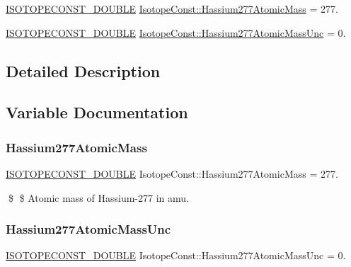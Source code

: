 \begin{DoxyCompactItemize}
\item 
\mbox{\hyperlink{group___isotope_const-_macros_ga8f45a7272ce02c0b4c65c44636ed719a}{I\+S\+O\+T\+O\+P\+E\+C\+O\+N\+S\+T\+\_\+\+D\+O\+U\+B\+LE}} \mbox{\hyperlink{group___isotope_const-_hassium-_hs277_ga415d2cce7d0eb1977b6da2f438b100d3}{Isotope\+Const\+::\+Hassium277\+Atomic\+Mass}} = 277.
\item 
\mbox{\hyperlink{group___isotope_const-_macros_ga8f45a7272ce02c0b4c65c44636ed719a}{I\+S\+O\+T\+O\+P\+E\+C\+O\+N\+S\+T\+\_\+\+D\+O\+U\+B\+LE}} \mbox{\hyperlink{group___isotope_const-_hassium-_hs277_gace10e3a38de9cd55bf6f67704df4accc}{Isotope\+Const\+::\+Hassium277\+Atomic\+Mass\+Unc}} = 0.
\end{DoxyCompactItemize}


\subsection{Detailed Description}


\subsection{Variable Documentation}
\mbox{\label{group___isotope_const-_hassium-_hs277_ga415d2cce7d0eb1977b6da2f438b100d3}} 
\subsubsection{\texorpdfstring{Hassium277\+Atomic\+Mass}{Hassium277AtomicMass}}
{\footnotesize\ttfamily \mbox{\hyperlink{group___isotope_const-_macros_ga8f45a7272ce02c0b4c65c44636ed719a}{I\+S\+O\+T\+O\+P\+E\+C\+O\+N\+S\+T\+\_\+\+D\+O\+U\+B\+LE}} Isotope\+Const\+::\+Hassium277\+Atomic\+Mass = 277.}

\$ \$ Atomic mass of Hassium-\/277 in amu. \mbox{\label{group___isotope_const-_hassium-_hs277_gace10e3a38de9cd55bf6f67704df4accc}} 
\subsubsection{\texorpdfstring{Hassium277\+Atomic\+Mass\+Unc}{Hassium277AtomicMassUnc}}
{\footnotesize\ttfamily \mbox{\hyperlink{group___isotope_const-_macros_ga8f45a7272ce02c0b4c65c44636ed719a}{I\+S\+O\+T\+O\+P\+E\+C\+O\+N\+S\+T\+\_\+\+D\+O\+U\+B\+LE}} Isotope\+Const\+::\+Hassium277\+Atomic\+Mass\+Unc = 0.}

